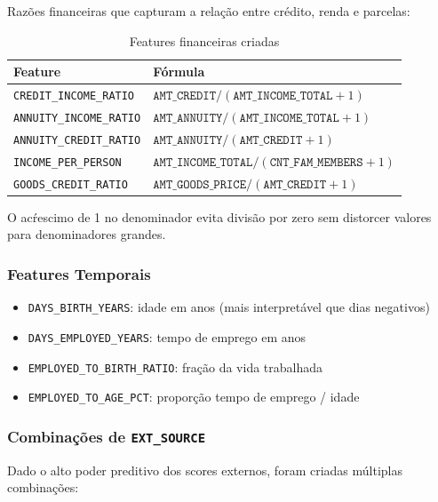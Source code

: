 \documentclass[12pt, a4paper]{article}
\begin{document}
Raz\~oes financeiras que capturam a rela\c{c}\~ao entre cr\'edito, renda e parcelas:

\begin{table}[H]
\centering
\begin{tabular}{ll}
\toprule
\textbf{Feature} & \textbf{F\'ormula} \\
\midrule
\texttt{CREDIT\_INCOME\_RATIO}  & $\texttt{AMT\_CREDIT} / (\texttt{AMT\_INCOME\_TOTAL} + 1)$ \\
\texttt{ANNUITY\_INCOME\_RATIO} & $\texttt{AMT\_ANNUITY} / (\texttt{AMT\_INCOME\_TOTAL} + 1)$ \\
\texttt{ANNUITY\_CREDIT\_RATIO} & $\texttt{AMT\_ANNUITY} / (\texttt{AMT\_CREDIT} + 1)$ \\
\texttt{INCOME\_PER\_PERSON}    & $\texttt{AMT\_INCOME\_TOTAL} / (\texttt{CNT\_FAM\_MEMBERS} + 1)$ \\
\texttt{GOODS\_CREDIT\_RATIO}   & $\texttt{AMT\_GOODS\_PRICE} / (\texttt{AMT\_CREDIT} + 1)$ \\
\bottomrule
\end{tabular}
\caption{Features financeiras criadas}
\end{table}

O ac\'rescimo de 1 no denominador evita divis\~ao por zero sem distorcer valores
para denominadores grandes.

\subsubsection{Features Temporais}

\begin{itemize}
    \item \texttt{DAYS\_BIRTH\_YEARS}: idade em anos (mais interpret\'avel que dias negativos)
    \item \texttt{DAYS\_EMPLOYED\_YEARS}: tempo de emprego em anos
    \item \texttt{EMPLOYED\_TO\_BIRTH\_RATIO}: fra\c{c}\~ao da vida trabalhada
    \item \texttt{EMPLOYED\_TO\_AGE\_PCT}: propor\c{c}\~ao tempo de emprego / idade
\end{itemize}

\subsubsection{Combina\c{c}\~oes de \texttt{EXT\_SOURCE}}

Dado o alto poder preditivo dos scores externos, foram criadas m\'ultiplas combina\c{c}\~oes:
\end{document}
